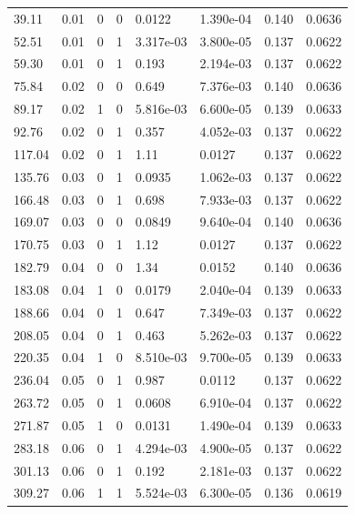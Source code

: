 \documentclass[preview]{standalone}
\begin{document}
{{\begin{tabular}{L{1.2cm}C{1.2cm} C{0.3cm}C{0.5cm} C{1.4cm}C{1.4cm} C{1.4cm}C{1.4cm}}
  39.11  &  0.01  & 0     &  0 &  0.0122  & 1.390e-04  & 0.140 &  0.0636   \\ 
  52.51  &  0.01  & 0     &  1 &  3.317e-03  & 3.800e-05  & 0.137 &  0.0622   \\ 
  59.30  &  0.01  & 0     &  1 &  0.193  & 2.194e-03  & 0.137 &  0.0622   \\ 
  75.84  &  0.02  & 0     &  0 &  0.649  & 7.376e-03  & 0.140 &  0.0636   \\ 
  89.17  &  0.02  & 1     &  0 &  5.816e-03  & 6.600e-05  & 0.139 &  0.0633   \\ 
  92.76  &  0.02  & 0     &  1 &  0.357  & 4.052e-03  & 0.137 &  0.0622   \\ 
  117.04  &  0.02  & 0     &  1 &  1.11  & 0.0127  & 0.137 &  0.0622   \\ 
  135.76  &  0.03  & 0     &  1 &  0.0935  & 1.062e-03  & 0.137 &  0.0622   \\ 
  166.48  &  0.03  & 0     &  1 &  0.698  & 7.933e-03  & 0.137 &  0.0622   \\ 
  169.07  &  0.03  & 0     &  0 &  0.0849  & 9.640e-04  & 0.140 &  0.0636   \\ 
  170.75  &  0.03  & 0     &  1 &  1.12  & 0.0127  & 0.137 &  0.0622   \\ 
  182.79  &  0.04  & 0     &  0 &  1.34  & 0.0152  & 0.140 &  0.0636   \\ 
  183.08  &  0.04  & 1     &  0 &  0.0179  & 2.040e-04  & 0.139 &  0.0633   \\ 
  188.66  &  0.04  & 0     &  1 &  0.647  & 7.349e-03  & 0.137 &  0.0622   \\ 
  208.05  &  0.04  & 0     &  1 &  0.463  & 5.262e-03  & 0.137 &  0.0622   \\ 
  220.35  &  0.04  & 1     &  0 &  8.510e-03  & 9.700e-05  & 0.139 &  0.0633   \\ 
  236.04  &  0.05  & 0     &  1 &  0.987  & 0.0112  & 0.137 &  0.0622   \\ 
  263.72  &  0.05  & 0     &  1 &  0.0608  & 6.910e-04  & 0.137 &  0.0622   \\ 
  271.87  &  0.05  & 1     &  0 &  0.0131  & 1.490e-04  & 0.139 &  0.0633   \\ 
  283.18  &  0.06  & 0     &  1 &  4.294e-03  & 4.900e-05  & 0.137 &  0.0622   \\ 
  301.13  &  0.06  & 0     &  1 &  0.192  & 2.181e-03  & 0.137 &  0.0622   \\ 
  309.27  &  0.06  & 1     &  1 &  5.524e-03  & 6.300e-05  & 0.136 &  0.0619   \\ 

\end{tabular}}}
\end{document}
